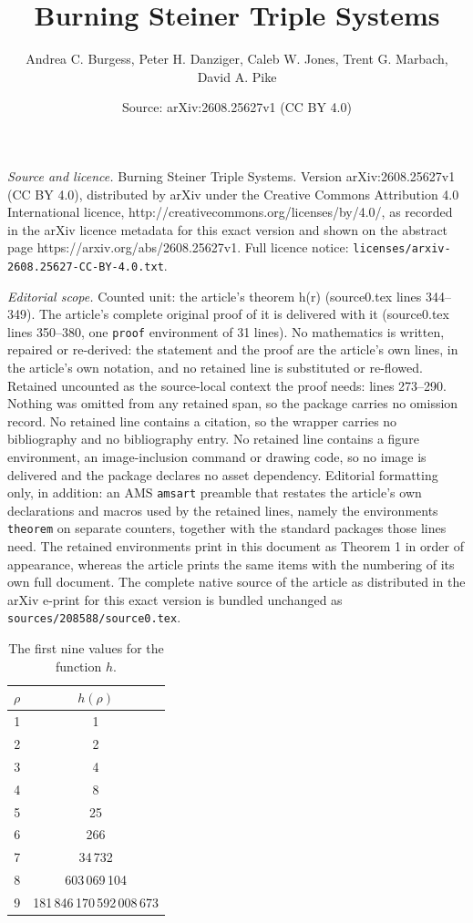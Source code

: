 \documentclass[10pt,a4paper]{amsart}
\title{Burning Steiner Triple Systems}
\author{Andrea C. Burgess, Peter H. Danziger, Caleb W. Jones, Trent G. Marbach, David A. Pike}
\date{Source: arXiv:2608.25627v1 (CC BY 4.0)}
\newcommand{\round}{{\rho}}
\begin{document}
\maketitle

\noindent\emph{Source and licence.} Burning Steiner Triple Systems. Version arXiv:2608.25627v1 (CC BY 4.0), distributed by arXiv under the Creative Commons Attribution 4.0 International licence, http://creativecommons.org/licenses/by/4.0/, as recorded in the arXiv licence metadata for this exact version and shown on the abstract page https://arxiv.org/abs/2608.25627v1. Full licence notice: \texttt{licenses/arxiv-2608.25627-CC-BY-4.0.txt}.\par\smallskip

\noindent\textit{Editorial scope.} Counted unit: the article's theorem h(r) (source0.tex lines 344--349). The article's complete original proof of it is delivered with it (source0.tex lines 350--380, one \texttt{proof} environment of 31 lines). No mathematics is written, repaired or re-derived: the statement and the proof are the article's own lines, in the article's own notation, and no retained line is substituted or re-flowed.  Retained uncounted as the source-local context the proof needs: lines 273--290.  Nothing was omitted from any retained span, so the package carries no omission record.  No retained line contains a citation, so the wrapper carries no bibliography and no bibliography entry.  No retained line contains a figure environment, an image-inclusion command or drawing code, so no image is delivered and the package declares no asset dependency.  Editorial formatting only, in addition: an AMS \texttt{amsart} preamble that restates the article's own declarations and macros used by the retained lines, namely the environments \texttt{theorem} on separate counters, together with the standard packages those lines need.  The retained environments print in this document as Theorem 1 in order of appearance, whereas the article prints the same items with the numbering of its own full document.  The complete native source of the article as distributed in the arXiv e-print for this exact version is bundled unchanged as \texttt{sources/208588/source0.tex}.
\begin{table}[ht]
\centering
\begin{tabular}{|c|c|}
\hline
$\round$ & $h(\round)$   \\ \hline 
1 & 1          \\ \hline  
2 & 2          \\ \hline  
3 & 4          \\ \hline  
4 & 8          \\ \hline  
5 & 25         \\ \hline  
6 & 266        \\ \hline  
7 & 34\,732      \\ \hline 
8 & 603\,069\,104  \\ \hline  
9 & 181\,846\,170\,592\,008\,673 \\ \hline 
\end{tabular}
\caption{The first nine values for the function $h$.}
\label{h_g_table}
\end{table}
\end{document}
